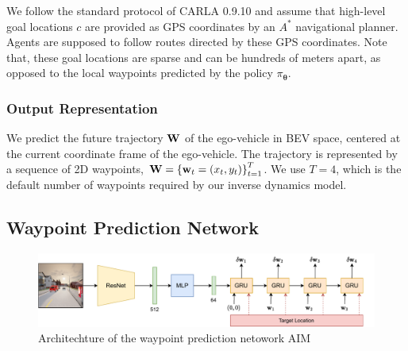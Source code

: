 \documentclass[letterpaper, 12pt]{book}
\theoremstyle{definition}
\theoremstyle{definition}
\theoremstyle{definition}
\theoremstyle{definition}
\theoremstyle{definition}
\begin{document}
\label{sec:org0cfebb7}
We follow the standard protocol of CARLA 0.9.10 and assume that high-level goal
locations \(c\) are provided as GPS coordinates by an \(A^{*}\) navigational
planner. Agents are supposed to follow routes directed by these GPS
coordinates. Note that, these goal locations are sparse and can be hundreds of
meters apart, as opposed to the local waypoints predicted by the policy
\(\pi_{\boldsymbol{\theta}}\).

\subsubsection{Output Representation}
\label{sec:orgdd01dae}
We predict the future trajectory \(\textbf W\) of the ego-vehicle in BEV space,
centered at the current coordinate frame of the ego-vehicle. The trajectory is
represented by a sequence of 2D waypoints, \(\textbf W = \left\lbrace \textbf w_t = (x_t ,
y_t) \right\rbrace_{t=1}^{T}\).  We use \(T=4\), which is the default number of waypoints
required by our inverse dynamics model.

\subsection{Waypoint Prediction Network \label{org6328e99}}
\label{sec:orgbc2bf88}
\begin{figure}[htbp]
\centering
\includegraphics[keepaspectratio,width=\textwidth,height=\textheight]{./img/aim.pdf}
\caption{\label{fig:orgabe7682}Architechture of the waypoint prediction netowork AIM \cite{Prakash2021}}
\end{figure}
\end{document}
